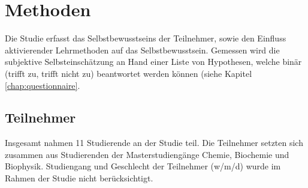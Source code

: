 \section{Methoden}
Die Studie erfasst das Selbstbewusstseins der Teilnehmer, sowie den Einfluss aktivierender Lehrmethoden auf das Selbstbewusstsein. Gemessen wird die subjektive Selbsteinschätzung an Hand einer Liste von Hypothesen, welche binär (trifft zu, trifft nicht zu) beantwortet werden können (siehe Kapitel \ref{chap:questionnaire}.

\subsection{Teilnehmer}
Insgesamt nahmen 11 Studierende an der Studie teil. Die Teilnehmer setzten sich zusammen aus Studierenden der Masterstudiengänge Chemie, Biochemie und Biophysik. Studiengang und Geschlecht der Teilnehmer (w/m/d) wurde im Rahmen der Studie nicht berücksichtigt.

